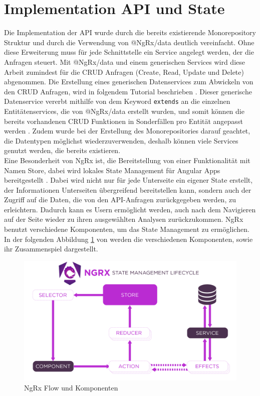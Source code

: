 \section{Implementation API und State}
Die Implementation der API wurde durch die bereits existierende Monorepository Struktur und durch die Verwendung von @NgRx/data \cite{NgRx.io.2024} deutlich vereinfacht. Ohne diese Erweiterung muss für jede Schnittstelle ein Service angelegt werden, der die Anfragen steuert. Mit @NgRx/data und einem generischen Services wird diese Arbeit zumindest für die CRUD Anfragen (Create, Read, Update und Delete) abgenommen. Die Erstellung eines generischen Datenservices zum Abwickeln von den CRUD Anfragen, wird in folgendem Tutorial beschrieben \cite{A.Waris.2023}.
Dieser generische Datenservice vererbt mithilfe von dem Keyword \texttt{extends} an die einzelnen Entitätenservices, die von @NgRx/data erstellt wurden, und somit können die bereits vorhandenen CRUD Funktionen in Sonderfällen pro Entität angepasst werden \cite{MicrosoftTypeScript.2024}.  
Zudem wurde bei der Erstellung des Monorepositories darauf geachtet, die Datentypen möglichst wiederzuverwenden, deshalb können viele Services genutzt werden, die bereits existieren.\\
Eine Besonderheit von NgRx ist, die Bereitstellung von einer Funktionalität mit Namen Store, dabei wird lokales State Management für Angular Apps bereitgestellt \cite{NgRx.io.2024b}. Dabei wird nicht nur für jede Unterseite ein eigener State erstellt, der Informationen Unterseiten übergreifend bereitstellen kann, sondern auch der Zugriff auf die Daten, die von den API-Anfragen zurückgegeben werden, zu erleichtern. Dadurch kann es Usern ermöglicht werden, auch nach dem Navigieren auf der Seite wieder zu ihren ausgewählten Analysen zurückzukommen. NgRx benutzt verschiedene Komponenten, um das State Management zu ermöglichen. In der folgenden Abbildung \ref{fig:NgRx} von \cite{NgRx.io.2024b} werden die verschiedenen Komponenten, sowie ihr Zusammenspiel dargestellt.
\begin{figure}[!h]
    \centering
    \includegraphics[width=0.75\linewidth]{gfx/NgRx.png}
    \caption{NgRx Flow und Komponenten \cite{NgRx.io.2024b}}
    \label{fig:NgRx}
\end{figure}
